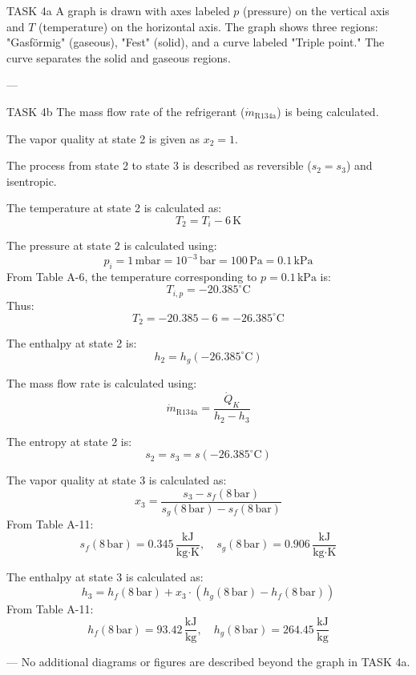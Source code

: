 TASK 4a  
A graph is drawn with axes labeled \( p \) (pressure) on the vertical axis and \( T \) (temperature) on the horizontal axis. The graph shows three regions: "Gasförmig" (gaseous), "Fest" (solid), and a curve labeled "Triple point." The curve separates the solid and gaseous regions.  

---

TASK 4b  
The mass flow rate of the refrigerant (\( \dot{m}_{\text{R134a}} \)) is being calculated.  

The vapor quality at state 2 is given as \( x_2 = 1 \).  

The process from state 2 to state 3 is described as reversible (\( s_2 = s_3 \)) and isentropic.  

The temperature at state 2 is calculated as:  
\[
T_2 = T_i - 6 \, \text{K}
\]  

The pressure at state 2 is calculated using:  
\[
p_i = 1 \, \text{mbar} = 10^{-3} \, \text{bar} = 100 \, \text{Pa} = 0.1 \, \text{kPa}
\]  
From Table A-6, the temperature corresponding to \( p = 0.1 \, \text{kPa} \) is:  
\[
T_{i,p} = -20.385^\circ \text{C}
\]  
Thus:  
\[
T_2 = -20.385 - 6 = -26.385^\circ \text{C}
\]  

The enthalpy at state 2 is:  
\[
h_2 = h_g(-26.385^\circ \text{C})
\]  

The mass flow rate is calculated using:  
\[
\dot{m}_{\text{R134a}} = \frac{\dot{Q}_K}{h_2 - h_3}
\]  

The entropy at state 2 is:  
\[
s_2 = s_3 = s(-26.385^\circ \text{C})
\]  

The vapor quality at state 3 is calculated as:  
\[
x_3 = \frac{s_3 - s_f(8 \, \text{bar})}{s_g(8 \, \text{bar}) - s_f(8 \, \text{bar})}
\]  
From Table A-11:  
\[
s_f(8 \, \text{bar}) = 0.345 \, \frac{\text{kJ}}{\text{kg·K}}, \quad s_g(8 \, \text{bar}) = 0.906 \, \frac{\text{kJ}}{\text{kg·K}}
\]  

The enthalpy at state 3 is calculated as:  
\[
h_3 = h_f(8 \, \text{bar}) + x_3 \cdot \left(h_g(8 \, \text{bar}) - h_f(8 \, \text{bar})\right)
\]  
From Table A-11:  
\[
h_f(8 \, \text{bar}) = 93.42 \, \frac{\text{kJ}}{\text{kg}}, \quad h_g(8 \, \text{bar}) = 264.45 \, \frac{\text{kJ}}{\text{kg}}
\]  

---  
No additional diagrams or figures are described beyond the graph in TASK 4a.